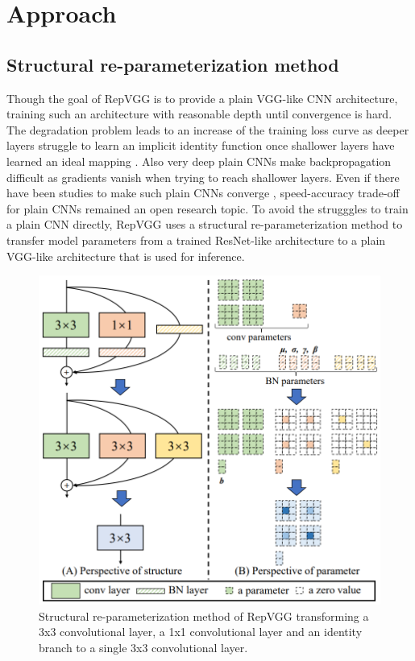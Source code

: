 \section{Approach} \label{approach}

\subsection{Structural re-parameterization method}

Though the goal of RepVGG is to provide a plain VGG-like CNN architecture, training such an architecture with reasonable depth until convergence is hard. The degradation problem leads to an increase of the training loss curve as deeper layers struggle to learn an implicit identity function once shallower layers have learned an ideal mapping \cite{KaimingHe.2015}. Also very deep plain CNNs make backpropagation difficult as gradients vanish when trying to reach shallower layers. Even if there have been studies to make such plain CNNs converge \cite{Xiao.2018, OyebadeKOyedotun.2020}, speed-accuracy trade-off for plain CNNs remained an open research topic. To avoid the strugggles to train a plain CNN directly, RepVGG uses a structural re-parameterization method to transfer model parameters from a trained ResNet-like architecture to a plain VGG-like architecture that is used for inference. 

\begin{figure}[t]
	\begin{center}
		\includegraphics[width=0.8\linewidth]{images/re-parameterization.PNG}
	\end{center}
	\caption{Structural re-parameterization method of RepVGG transforming a 3x3 convolutional layer, a 1x1 convolutional layer and an identity branch to a single 3x3 convolutional layer.}
	\label{fig:reparameterization}
\end{figure}

